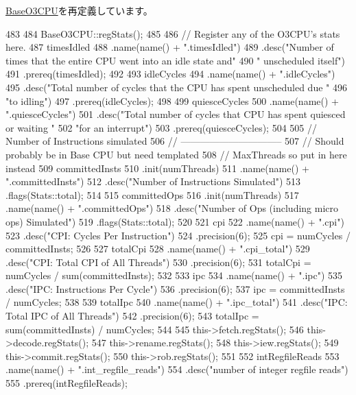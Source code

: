 \hyperlink{classBaseO3CPU_a4dc637449366fcdfc4e764cdf12d9b11}{BaseO3CPU}を再定義しています。


\begin{DoxyCode}
483 {
484     BaseO3CPU::regStats();
485 
486     // Register any of the O3CPU's stats here.
487     timesIdled
488         .name(name() + ".timesIdled")
489         .desc("Number of times that the entire CPU went into an idle state and"
490               " unscheduled itself")
491         .prereq(timesIdled);
492 
493     idleCycles
494         .name(name() + ".idleCycles")
495         .desc("Total number of cycles that the CPU has spent unscheduled due "
496               "to idling")
497         .prereq(idleCycles);
498 
499     quiesceCycles
500         .name(name() + ".quiesceCycles")
501         .desc("Total number of cycles that CPU has spent quiesced or waiting "
502               "for an interrupt")
503         .prereq(quiesceCycles);
504 
505     // Number of Instructions simulated
506     // --------------------------------
507     // Should probably be in Base CPU but need templated
508     // MaxThreads so put in here instead
509     committedInsts
510         .init(numThreads)
511         .name(name() + ".committedInsts")
512         .desc("Number of Instructions Simulated")
513         .flags(Stats::total);
514 
515     committedOps
516         .init(numThreads)
517         .name(name() + ".committedOps")
518         .desc("Number of Ops (including micro ops) Simulated")
519         .flags(Stats::total);
520 
521     cpi
522         .name(name() + ".cpi")
523         .desc("CPI: Cycles Per Instruction")
524         .precision(6);
525     cpi = numCycles / committedInsts;
526 
527     totalCpi
528         .name(name() + ".cpi_total")
529         .desc("CPI: Total CPI of All Threads")
530         .precision(6);
531     totalCpi = numCycles / sum(committedInsts);
532 
533     ipc
534         .name(name() + ".ipc")
535         .desc("IPC: Instructions Per Cycle")
536         .precision(6);
537     ipc =  committedInsts / numCycles;
538 
539     totalIpc
540         .name(name() + ".ipc_total")
541         .desc("IPC: Total IPC of All Threads")
542         .precision(6);
543     totalIpc =  sum(committedInsts) / numCycles;
544 
545     this->fetch.regStats();
546     this->decode.regStats();
547     this->rename.regStats();
548     this->iew.regStats();
549     this->commit.regStats();
550     this->rob.regStats();
551 
552     intRegfileReads
553         .name(name() + ".int_regfile_reads")
554         .desc("number of integer regfile reads")
555         .prereq(intRegfileReads);
}
\end{DoxyCode}
